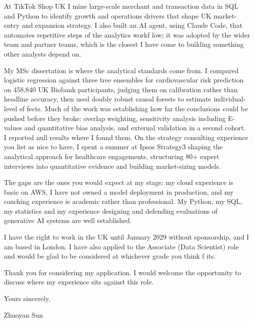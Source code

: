 \documentclass[letterpaper,11pt]{article}
\begin{document}
At TikTok Shop UK I mine large-scale merchant and transaction data in SQL and Python to identify growth and operations drivers that shape UK market-entry and expansion strategy. I also built an AI agent, using Claude Code, that automates repetitive steps of the analytics workf\kern0pt low; it was adopted by the wider team and partner teams, which is the closest I have come to building something other analysts depend on.

My MSc dissertation is where the analytical standards come from. I compared logistic regression against three tree ensembles for cardiovascular risk prediction on 458,840 UK Biobank participants, judging them on calibration rather than headline accuracy, then used doubly robust causal forests to estimate individual-level ef\kern0pt fects. Much of the work was establishing how far the conclusions could be pushed before they broke: overlap weighting, sensitivity analysis including E-values and quantitative bias analysis, and external validation in a second cohort. I reported null results where I found them. On the strategy consulting experience you list as nice to have, I spent a summer at Ipsos Strategy3 shaping the analytical approach for healthcare engagements, structuring 80+ expert interviews into quantitative evidence and building market-sizing models.

The gaps are the ones you would expect at my stage: my cloud experience is basic on AWS, I have not owned a model deployment in production, and my coaching experience is academic rather than professional. My Python, my SQL, my statistics and my experience designing and defending evaluations of generative AI systems are well established.

I have the right to work in the UK until January 2029 without sponsorship, and I am based in London. I have also applied to the Associate (Data Scientist) role and would be glad to be considered at whichever grade you think f\kern0pt its.

Thank you for considering my application. I would welcome the opportunity to discuss where my experience sits against this role.

\vspace{2pt}
Yours sincerely,

\vspace{8pt}
Zhuoyan Sun
\end{document}
